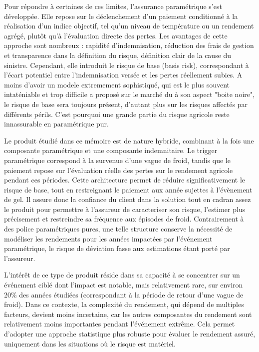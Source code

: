 \documentclass[11pt,a4paper,openright,twoside]{report}
\begin{document}
Pour répondre à certaines de ces limites, l’assurance paramétrique s’est développée. Elle repose sur le déclenchement d’un paiement conditionné à la réalisation d’un indice objectif, tel qu’un niveau de température ou un rendement agrégé, plutôt qu’à l’évaluation directe des pertes. Les avantages de cette approche sont nombreux : rapidité d’indemnisation, réduction des frais de gestion et transparence dans la définition du risque, définition clair de la cause du sinistre. Cependant, elle introduit le risque de base (basis risk), correspondant à l’écart potentiel entre l’indemnisation versée et les pertes réellement subies. A moins d'avoir un modele extremement sophistiqué, qui est le plus souvent intaténiable et trop difficile a proposé sur le marché du à son aspect "boite noire", le risque de base sera toujours présent, d'autant plus sur les risques affectés par différents périls. C'est pourquoi une grande partie du risque agricole reste innassurable en paramétrique pur.

Le produit étudié dans ce mémoire est de nature hybride, combinant à la fois une composante paramétrique et une composante indemnitaire. Le trigger paramétrique correspond à la survenue d’une vague de froid, tandis que le paiement repose sur l’évaluation réelle des pertes sur le rendement agricole pendant ces périodes. Cette architecture permet de réduire significativement le risque de base, tout en restreignant le paiement aux année sujettes à l'évènement de gel. Il assure donc la confiance du client dans la solution tout en cadran assez le produit pour permettre à l'assureur de caracteriser son risque, l'estimer plus précisement et restreindre sa fréquence aux épisodes de froid. Contrairement à des police paramétriques pures, une telle structure conserve la nécessité de modéliser les rendements pour les années impactées par l’événement paramétrique, le risque de déviation fasse aux estimations étant porté par l'assureur.

L’intérêt de ce type de produit réside dans sa capacité à se concentrer sur un événement ciblé dont l’impact est notable, mais relativement rare, sur environ 20\% des années étudiées (correspondant à la période de retour d’une vague de froid). Dans ce contexte, la complexité du rendement, qui dépend de multiples facteurs, devient moins incertaine, car les autres composantes du rendement sont relativement moins importantes pendant l’événement extrême. Cela permet d’adopter une approche statistique plus robuste pour évaluer le rendement assuré, uniquement dans les situations où le risque est matériel.
\end{document}
